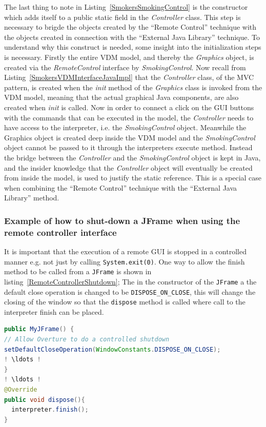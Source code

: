 \documentclass{overturerepchap}
\begin{document}
The last thing to note in Listing~\ref{SmokersSmokingControl} is the constructor which adds itself to a public static field in the \textit{Controller} class. This step is necessary to brigde the objects created by the ``Remote Control'' technique with the objects created in connection with the ``External Java Library'' technique. 
To understand why this construct is needed, some insight into the initialization steps is necessary. Firstly the entire VDM model, and thereby the \textit{Graphics} object, is created via the \textit{RemoteControl} interface by \textit{SmokingControl}. Now recall from Listing~\ref{SmokersVDMInterfaceJavaImpl} that the \textit{Controller} class, of the MVC pattern, is created when the \textit{init} method of the \textit{Graphics} class is invoked from the VDM model, meaning that the actual graphical Java components, are also created when \textit{init} is called. Now in order to connect a click on the GUI buttons with the commands that can be executed in the model, the \textit{Controller} needs to have access to the interpreter, i.e. the \textit{SmokingControl} object. Meanwhile the Graphics object is created deep inside the VDM model and the \textit{SmokingControl} object cannot be passed to it through the interpreters execute method. Instead the bridge between the \textit{Controller} and the \textit{SmokingControl} object is kept in Java, and the insider knowledge that the \textit{Controller} object will eventually be created from inside the model, is used  to justify the static reference. This is a special case when combining the ``Remote Control'' technique with the ``External Java Library'' method.

\subsubsection{Example of how to shut-down a JFrame when using the remote controller interface}
It is important that the execution of a remote GUI is stopped in a controlled manner e.g. not just by calling \texttt{System.exit(0)}. One way to allow the finish method to be called from a \texttt{JFrame} is shown in listing~\ref{RemoteControllerShutdown}; The in the constructor of the \texttt{JFrame} a the default close operation is changed to be \texttt{DISPOSE\_ON\_CLOSE}, this will change the closing of the window so that the \texttt{dispose} method is called where call to the interpreter finish can be placed.

\begin{lstlisting}[language=Java,label=RemoteControllerShutdown,caption=Java implementation of a \texttt{finish} method for a \texttt{JFrame}., captionpos=b]
public MyJFrame() {
// Allow Overture to do a controlled shutdown 
setDefaultCloseOperation(WindowConstants.DISPOSE_ON_CLOSE);
! \ldots !
}
! \ldots !
@Override
public void dispose(){
  interpreter.finish();
}
\end{lstlisting}
\end{document}
